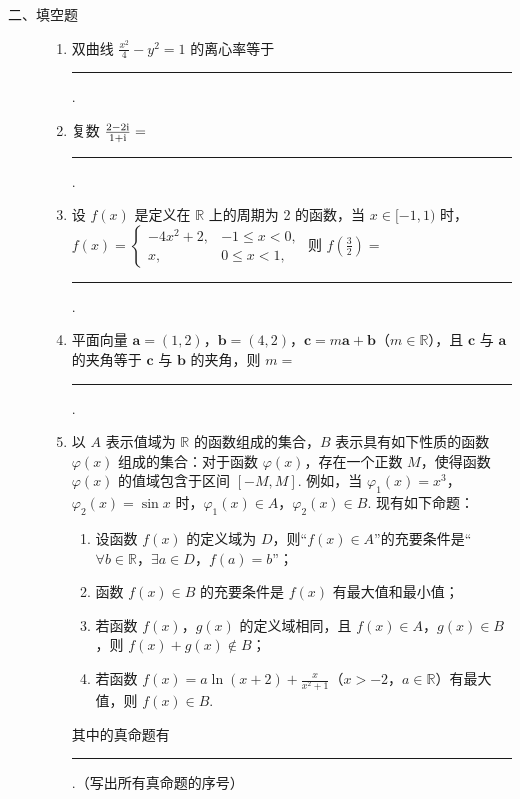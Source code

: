 \begin{description}

    \item[二、填空题]

    \begin{enumerate}[leftmargin=5pt]

      \addtocounter{enumi}{+10}

        \item 双曲线 \(\frac{x^{2}}{4} - y^{2} = 1\) 的离心率等于\rule[-0.3ex]{3em}{0.4pt}.

        \item 复数 \(\frac{2 - 2\mathrm{i}}{1 + \mathrm{i}} =\)\rule[-0.3ex]{3em}{0.4pt}.

        \item 设 \(f(x)\) 是定义在 \(\mathbb{R}\) 上的周期为 2 的函数，当 \(x \in [-1,1)\) 时，\(f(x) = \begin{cases}
-4x^{2} + 2, & -1 \leqslant x < 0,\\
    x, & 0 \leqslant x < 1,
\end{cases}\) 则 \(f\left(\frac{3}{2}\right) =\)\rule[-0.3ex]{3em}{0.4pt}.

        \item 平面向量 \(\bm{a} = (1, 2)\)，\(\bm{b} = (4, 2)\)，\(\bm{c} = m\bm{a} + \bm{b}\)（\(m \in \mathbb{R}\)），且 \(\bm{c}\) 与 \(\bm{a}\) 的夹角等于 \(\bm{c}\) 与 \(\bm{b}\) 的夹角，则 \(m =\)\rule[-0.3ex]{3em}{0.4pt}.

        \item 以 \(A\) 表示值域为 \(\mathbb{R}\) 的函数组成的集合，\(B\) 表示具有如下性质的函数 \(\varphi(x)\) 组成的集合：对于函数 \(\varphi(x)\)，存在一个正数 \(M\)，使得函数 \(\varphi(x)\) 的值域包含于区间 \([-M, M]\). 例如，当 \(\varphi_{1}(x) = x^{3}\)，\(\varphi_{2}(x) = \sin x\) 时，\(\varphi_{1}(x) \in A\)，\(\varphi_{2}(x) \in B\). 现有如下命题：

\begin{enumerate}[itemsep=0pt,topsep=0pt,parsep=0pt,partopsep=0pt]
\item 设函数 \(f(x)\) 的定义域为 \(D\)，则“\(f(x) \in A\)”的充要条件是“\(\forall b \in \mathbb{R}\)，\(\exists a \in D\)，\(f(a)=b\)”；
\item 函数 \(f(x) \in B\) 的充要条件是 \(f(x)\) 有最大值和最小值；
\item 若函数 \(f(x)\)，\(g(x)\) 的定义域相同，且 \(f(x) \in A\)，\(g(x) \in B\)，则 \(f(x)+g(x) \notin B\)；
\item 若函数 \(f(x) = a\ln(x + 2) + \frac{x}{x^{2} + 1}\)（\(x > -2\)，\(a \in \mathbb{R}\)）有最大值，则 \(f(x) \in B\).
\end{enumerate}

其中的真命题有\rule[-0.3ex]{3em}{0.4pt}.（写出所有真命题的序号）

    \end{enumerate}

\end{description}

